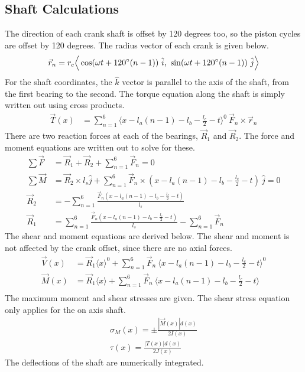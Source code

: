 \documentclass[10pt,a4paper]{article}
\begin{document}
\subsection*{Shaft Calculations}
The direction of each crank shaft is offset by 120 degrees too, so the piston cycles are offset by 120 degrees. The radius vector of each crank is given below.
\begin{align}
	\vec{r}_n = r_c \Big \langle \cos (\omega t + 120 \degree (n-1)  )\ \hat{i},\ \sin (\omega t + 120 \degree (n-1))\ \hat{j}  \Big \rangle
\end{align}
For the shaft coordinates, the $\hat{k}$ vector is parallel to the axis of the shaft, from the first bearing to the second. The torque equation along the shaft is simply written out using cross products.
\begin{align}
	\vec{T}(x) &= \sum_{n=1}^6 \langle x - l_a (n-1) - l_b - \frac{l_c}{2} - t\rangle^0\ \vec{F}_n \times \vec{r}_n 
\end{align}
There are two reaction forces at each of the bearings, $\vec{R}_1$ and $\vec{R}_2$. The force and moment equations are written out to solve for these.
\begin{align}
	\sum \vec{F} &= \vec{R}_1 + \vec{R}_2 + \sum_{n=1}^6 \vec{F}_n = 0 \\
	\sum \vec{M} &= \vec{R}_2 \times l_s \hat{j} + \sum_{n=1}^6 \vec{F}_n \times ( x - l_a (n-1) - l_b - \frac{l_c}{2} - t)\ \hat{j} = 0\\
	\vec{R}_2 &= - \sum_{n=1}^6 \frac{\vec{F}_n ( x - l_a (n-1) - l_b - \frac{l_c}{2} - t)}{l_s}\\
	\vec{R}_1 &= \sum_{n=1}^6 \frac{\vec{F}_n ( x - l_a (n-1) - l_b - \frac{l_c}{2} - t)}{l_s} - \sum_{n=1}^6 \vec{F}_n
\end{align}
The shear and moment equations are derived below. The shear and moment is not affected by the crank offset, since there are no axial forces.
\begin{align}
	\vec{V}(x) &= \vec{R}_1 \langle x \rangle^0 + \sum_{n=1}^6 \vec{F}_n\ \langle x - l_a (n-1) - l_b - \frac{l_c}{2} - t\rangle^0\\
	\vec{M}(x) &= \vec{R}_1 \langle x \rangle + \sum_{n=1}^6 \vec{F}_n\ \langle x - l_a (n-1) - l_b - \frac{l_c}{2} - t\rangle\\
\end{align}
The maximum moment and shear stresses are given. The shear stress equation only applies for the on axis shaft.
\begin{align}
	\sigma_M (x) = \pm \frac{|\vec{M}(x)| d(x)}{2 I(x)}\\
	\tau (x) = \frac{|T(x)| d (x)}{2 J(x)}
\end{align}
The deflections of the shaft are numerically integrated.
\end{document}
